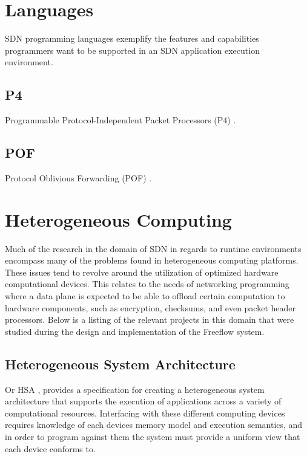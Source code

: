 \section{Languages}
\label{related:lang}
SDN programming languages exemplify the features and capabilities programmers
want to be supported in an SDN application execution environment.


\subsection{P4}
\label{related:p4}
Programmable Protocol-Independent Packet Processors (P4) \cite{p4}.

\subsection{POF}
\label{related:pof}
Protocol Oblivious Forwarding (POF) \cite{pof}.

\section{Heterogeneous Computing}
\label{related:hcp}
Much of the research in the domain of SDN in regards to runtime environments
encompass many of the problems found in heterogeneous computing platforms.
These issues tend to revolve around the utilization of optimized hardware
computational devices. This relates to the needs of networking programming
where a data plane is expected to be able to offload certain computation to
hardware components, such as encryption, checksums, and even packet header
processors. Below is a listing of the relevant projects in this domain that
were studied during the design and implementation of the Freeflow system.

\subsection{Heterogeneous System Architecture}
\label{related:hsa}
Or HSA \cite{hsa}, provides a specification for creating a heterogeneous
system architecture that supports the execution of applications across a
variety of computational resources. Interfacing with these different computing
devices requires knowledge of each devices memory model and execution
semantics, and in order to program against them the system must provide a
uniform view that each device conforms to.

